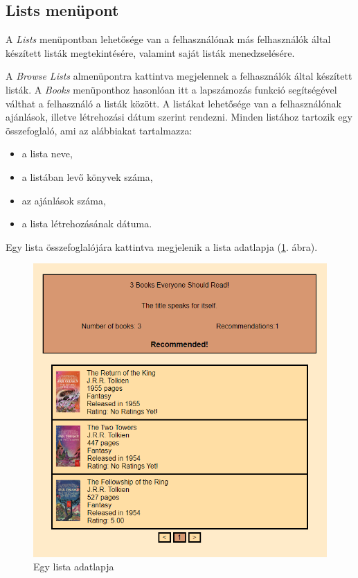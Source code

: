 \subsection{Lists menüpont}

A \textit{Lists} menüpontban lehetősége van a felhasználónak más felhasználók által készített listák megtekintésére, valamint saját listák menedzselésére.

A \textit{Browse Lists} almenüpontra kattintva megjelennek a felhasználók által készített listák. A \textit{Books} menüponthoz hasonlóan itt a lapszámozás funkció segítségével válthat a felhasználó a listák között. A listákat lehetősége van a felhasználónak ajánlások, illetve létrehozási dátum szerint rendezni. Minden listához tartozik egy összefoglaló, ami az alábbiakat tartalmazza:
\begin{itemize}
    \item a lista neve,
    \item a listában levő könyvek száma,
    \item az ajánlások száma,
    \item a lista létrehozásának dátuma.
\end{itemize}
Egy lista összefoglalójára kattintva megjelenik a lista adatlapja (\ref{fig:listcard}. ábra).

\begin{figure}[h]
    \centering
    \includegraphics[scale=0.65]{images/application/listcard.png}
    \caption{Egy lista adatlapja}
    \label{fig:listcard}
\end{figure}

